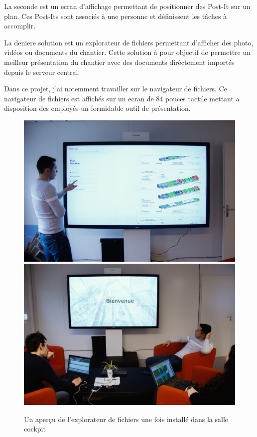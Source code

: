 La seconde est un ecran d'affichage permettant de positionner des Post-It sur un plan.
Ces Post-Its sont associés à une personne et définissent les tâches à accomplir.

La deniere solution est un explorateur de fichiers permettant d'afficher des photo, vidéos ou documents du chantier.
Cette solution à pour objectif de permettre un meilleur présentation du chantier avec des documents dirèctement importés depuis le serveur central.

\medskip

Dans ce projet, j'ai notemment travailler sur le navigateur de fichiers.
Ce navigateur de fichiers est affichés sur un ecran de 84 pouces tactile mettant a disposition des employés un formidable outil de présentation.

\begin{figure}[h]
    \centering
    \includegraphics[scale=0.45]{img/media-reader-pres-1.jpg}
    \includegraphics[scale=0.45]{img/media-reader-pres-2.jpg}
    \caption{Un aperçu de l'explorateur de fichiers une fois installé dans la salle cockpit}
\end{figure}


